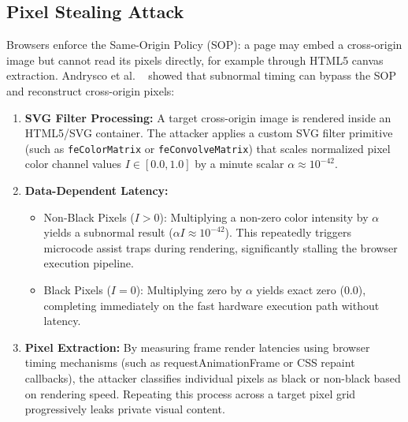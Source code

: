 \subsection{Pixel Stealing Attack}
Browsers enforce the Same-Origin Policy (SOP): a page may embed a cross-origin image but cannot read its pixels directly, for example through HTML5 canvas extraction. Andrysco et al. ~\cite{andrysco2015subnormal} showed that subnormal timing can bypass the SOP and reconstruct cross-origin pixels:
\begin{enumerate}
    \item \textbf{SVG Filter Processing:} A target cross-origin image is rendered inside an HTML5/SVG container. The attacker applies a custom SVG filter primitive (such as \texttt{feColorMatrix} or \texttt{feConvolveMatrix}) that scales normalized pixel color channel values $I \in [0.0, 1.0]$ by a minute scalar $\alpha \approx 10^{-42}$.
    \item \textbf{Data-Dependent Latency:}
    \begin{itemize}
        \item Non-Black Pixels ($I > 0$): Multiplying a non-zero color intensity by $\alpha$ yields a subnormal result ($\alpha I \approx 10^{-42}$). This repeatedly triggers microcode assist traps during rendering, significantly stalling the browser execution pipeline.
        \item Black Pixels ($I = 0$): Multiplying zero by $\alpha$ yields exact zero ($0.0$), completing immediately on the fast hardware execution path without latency.
    \end{itemize}
    \item \textbf{Pixel Extraction:} By measuring frame render latencies using browser timing mechanisms (such as requestAnimationFrame or CSS repaint callbacks), the attacker classifies individual pixels as black or non-black based on rendering speed. Repeating this process across a target pixel grid progressively leaks private visual content.
\end{enumerate}